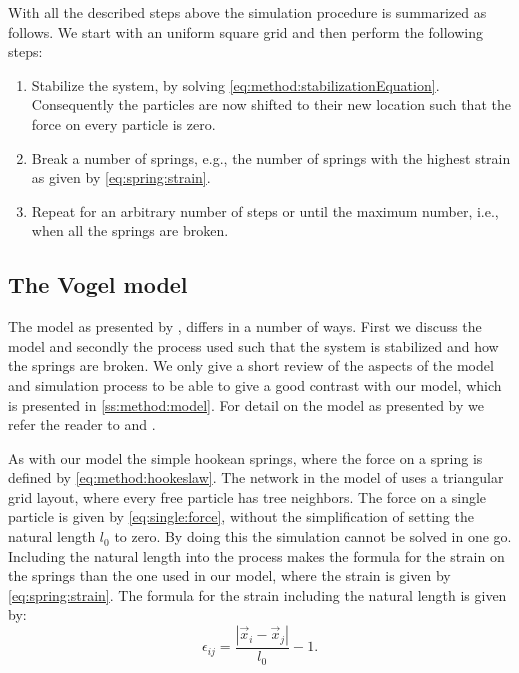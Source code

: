 With all the described steps above the simulation procedure is summarized as follows. We start with an uniform square grid and then perform the following steps:
\begin{enumerate}
	\item Stabilize the system, by solving \eqref{eq:method:stabilizationEquation}. Consequently the particles are now shifted to their new location such that the force on every particle is zero.
	\item Break a number of springs, e.g., the number of springs with the highest strain as given by \eqref{eq:spring:strain}.
	\item Repeat for an arbitrary number of steps or until the maximum number, i.e., when all the springs are broken. 
\end{enumerate}

\subsection{The Vogel model}\label{ss:method:vogel}

The model as presented by \citeauthor{vogel2005studies2} \cite{vogel2005studies2}, differs in a number of ways. First we discuss the model and secondly the process used such that the system is stabilized and how the springs are broken. We only give a short review of the aspects of the model and simulation process to be able to give a good contrast with our model, which is presented in \cref{ss:method:model}. For detail on the model as presented by \citeauthor{vogel2005studies2} we refer the reader to \cite{vogel2005studies1} and \cite{vogel2005studies2}. 

As with our model the simple hookean springs, where the force on a spring is defined by \eqref{eq:method:hookeslaw}. The network in the model of \citeauthor{vogel2005studies2} uses a triangular grid layout, where every free particle has tree neighbors. The force on a single particle is given by \eqref{eq:single:force}, without the simplification of setting the natural length $l_0$ to zero. By doing this the simulation cannot be solved in one go. Including the natural length into the process makes the formula for the strain on the springs than the one used in our model, where the strain is given by \eqref{eq:spring:strain}. The formula for the strain including the natural length is given by:
%
\begin{equation}\label{eq:method:strain_vogel}
	\epsilon_{ij} = \frac{|\vec{x}_i - \vec{x}_j|}{l_0} - 1.
\end{equation}

